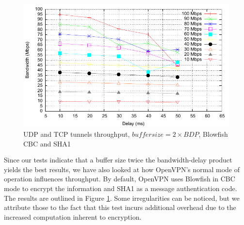 \begin{figure}
  \centering
  \includegraphics[width=\textwidth]{img/test-mptcp-2-crypto}
  \caption{UDP and TCP tunnels throughput, $buffer size = 2 \times BDP$, Blowfish CBC and SHA1}
  \label{fig:mptcp-2-crypto}
\end{figure}

Since our tests indicate that a buffer size twice the bandwidth-delay product
yields the best results, we have also looked at how OpenVPN's normal mode of
operation influences throughput. By default, OpenVPN uses Blowfish in CBC mode
to encrypt the information and SHA1 as a message authentication code. The
results are outlined in Figure \ref{fig:mptcp-2-crypto}. Some irregularities can be
noticed, but we attribute those to the fact that this test incurs additional
overhead due to the increased computation inherent to encryption.


